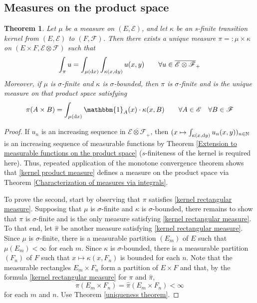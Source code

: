 \documentclass[11pt, a4paper, openany]{book}
\newtheorem{thm}{Theorem}\newtheorem{lem}{Lemma}\newtheorem{crl}{Corollary}
\theoremstyle{definition}
\begin{document}
\subsection{Measures on the product space}
    \begin{thm}\label{measures on the product space}
        Let $\mu$ be a measure on $(E,\mathscr{E})$, and let $\kappa$
        be an s-finite transition kernel from $(E,\mathscr{E})$
        to $(F,\mathscr{F})$. Then there exists a unique measure $\pi=:\mu\times \kappa$ on
        $(E\times F,\mathscr{E}\otimes\mathscr{F})$ such that
        \begin{equation}\label{kernel product measure}
        \int_\pi u
        =\int_{\mu(\odif x)}\int_{\kappa(x,\odif y)}u(x,y)
        \qquad
        \forall u\in\overline{\mathscr{E}\otimes\mathscr{F}}_+
        \end{equation}
        Moreover, if $\mu$ is $\sigma$-finite and $\kappa$ is
        $\sigma$-bounded, then $\pi$ is $\sigma$-finite and is
        the unique measure on that product space satisfying
        \begin{equation}\label{kernel rectangular measure}
        \pi(A\times B)
        =\int_{\mu(\odif x)}\mathbbm{1}_A(x)\cdot \kappa(x,B)\qquad \forall A\in\mathscr{E}\quad\forall B\in\mathscr{F}
        \end{equation}
    \end{thm}
    \begin{proof}
        If $u_n$ is an increasing sequence in $\overline{\mathscr{E}\otimes\mathscr{F}}_+$, then $(x\mapsto \int_{\kappa(x,\odif y)}u_n(x,y))_{n\in\mathbb{N}}$ is an increasing sequence of measurable functions by Theorem \ref{Extension to measurable functions on the product space} ($s$-finiteness of the kernel is required here). Thus, repeated application of the monotone convergence theorem shows that \eqref{kernel product measure} defines a measure on the product space via Theorem \ref{Characterization of measures via integrals}.

        To prove the second, start by observing that $\pi$ satisfies
        \eqref{kernel rectangular measure}.
        Supposing that $\mu$ is $\sigma$-finite and $\kappa$ is $\sigma$-bounded,
        there remains to show that $\pi$ is $\sigma$-finite and is the only measure
        satisfying \eqref{kernel rectangular measure}.
        To that end, let $\hat{\pi}$ be another measure satisfying
        \eqref{kernel rectangular measure}.
        Since $\mu$ is $\sigma$-finite, there is a measurable partition $(E_m)$
        of $E$ such that $\mu(E_m)<\infty$ for each $m$.
        Since $\kappa$ is $\sigma$-bounded, there is a measurable partition $(F_n)$
        of $F$ such that $x\mapsto\kappa(x,F_n)$ is bounded for each $n$.
        Note that the measurable rectangles $E_m\times F_n$ form a partition
        of $E\times F$ and that, by the formula
        \eqref{kernel rectangular measure}
        for $\pi$ and $\hat{\pi}$,
        \[
            \pi(E_m\times F_n)=\hat{\pi}(E_m\times F_n)<\infty
        \]
        for each $m$ and $n$. Use Theorem \ref{uniqueness theorem}.
    \end{proof}
\end{document}
